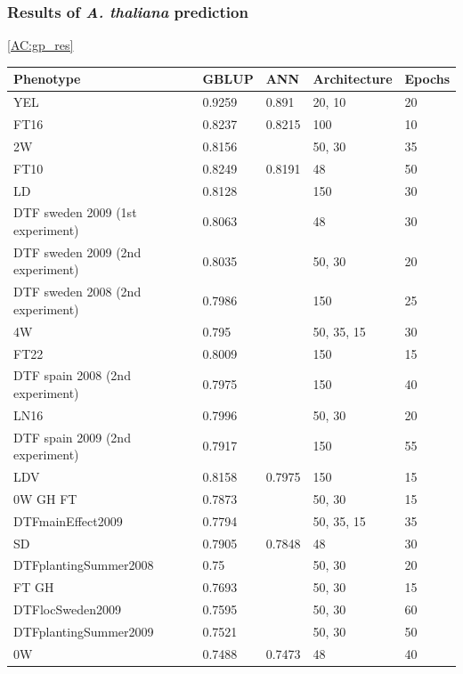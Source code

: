 \subsubsection{Results of \textit{A. thaliana} prediction}
\ref{AC:gp_res}
\begin{longtable}{p{} p{} p{} p{} p{}}
  \hline
  Phenotype & GBLUP & ANN & Architecture & Epochs \\
  \hline
  YEL  & 0.9259 & 0.891 & 20, 10 & 20 \\
  FT16 & 0.8237 & 0.8215 & 100 & 10 \\
  2W & 0.8156 & \color{red}{0.8205} & 50, 30 & 35 \\
  FT10 & 0.8249 & 0.8191 & 48 & 50 \\
  LD & 0.8128 & \color{red}{0.8159} & 150 & 30 \\
  DTF sweden 2009 (1st experiment) & 0.8063 & \color{red}{0.8141} & 48 & 30 \\
  DTF sweden 2009 (2nd experiment) & 0.8035 & \color{red}{0.8091} & 50, 30 & 20 \\
  DTF sweden 2008 (2nd experiment) & 0.7986 & \color{red}{0.8057} & 150 & 25 \\
  4W & 0.795 & \color{red}{0.8052} & 50, 35, 15 & 30 \\
  FT22 & 0.8009 & \color{red}{0.8043} & 150 & 15 \\
  DTF spain 2008 (2nd experiment) & 0.7975 & \color{red}{0.8032} & 150 & 40 \\
  LN16 & 0.7996 & \color{red}{0.7999} & 50, 30 & 20 \\
  DTF spain 2009 (2nd experiment) & 0.7917 & \color{red}{0.7988} & 150 & 55 \\
  LDV & 0.8158 & 0.7975 & 150 & 15 \\
  0W GH FT & 0.7873 & \color{red}{0.7942} & 50, 30 & 15 \\
  DTFmainEffect2009 & 0.7794 & \color{red}{0.7855} & 50, 35, 15 & 35 \\
  SD & 0.7905 & 0.7848 & 48 & 30 \\
  DTFplantingSummer2008 & 0.75 & \color{red}{0.7746} & 50, 30 & 20 \\
  FT GH & 0.7693 & \color{red}{0.7702} & 50, 30 & 15 \\
  DTFlocSweden2009 & 0.7595 & \color{red}{0.7626} & 50, 30 & 60 \\
  DTFplantingSummer2009 & 0.7521 & \color{red}{0.7584} & 50, 30 & 50 \\
  0W & 0.7488 & 0.7473 & 48 & 40 \\

\end{longtable}
